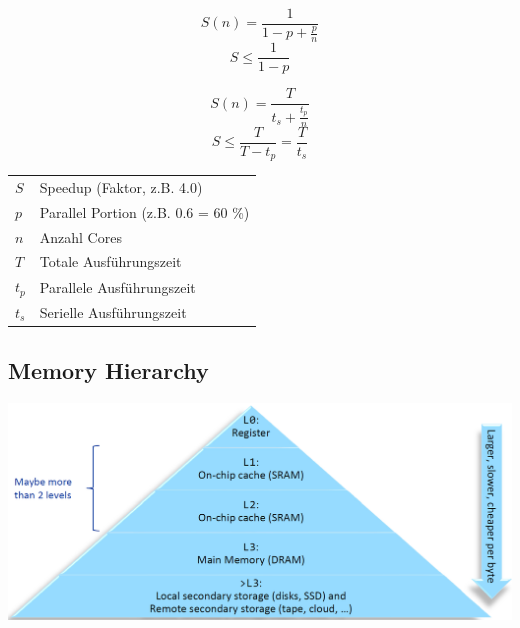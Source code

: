 
\begin{minipage}[c]{0.25\columnwidth}
    $$ S(n) = \frac{1}{1 - p + \frac{p}{n}} $$
    $$ S \leq \frac{1}{1-p} $$
\end{minipage}
\hfill
\begin{minipage}[c]{0.25\columnwidth}
    $$ S(n) = \frac{T}{t_s + \frac{t_p}{n}} $$
    $$ S \leq \frac{T}{T - t_p} = \frac{T}{t_s} $$
\end{minipage}
\hfill
\begin{minipage}[c]{0.48\columnwidth}
    \begin{tabular}{ll}
        $S$     & Speedup (Faktor, z.B. 4.0)            \\
        $p$     & Parallel Portion (z.B. 0.6 = 60 \%)   \\
        $n$     & Anzahl Cores                          \\
        $T$     & Totale Ausführungszeit                \\
        $t_p$   & Parallele Ausführungszeit             \\
        $t_s$   & Serielle Ausführungszeit  
    \end{tabular}
\end{minipage}


\subsection{Memory Hierarchy}

\begin{center}
    \includegraphics[width=0.88\columnwidth]{images/multiprocessor_memory.png}
\end{center}



